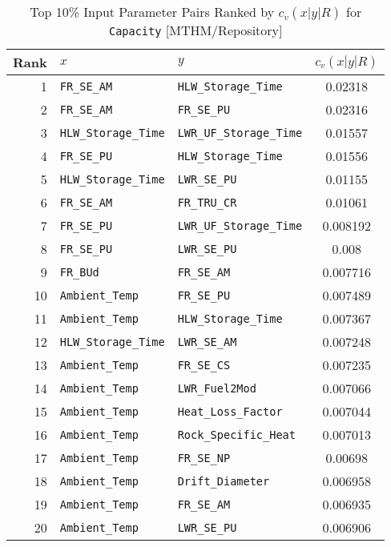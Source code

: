 \begin{center}
\begin{table}[htbp]
\caption{Top 10\% Input Parameter Pairs Ranked by $c_v(x|y|R)$ for \texttt{Capacity} [MTHM/Repository]}
\label{cv_x_y_R_for_Capacity_with_IJK7}
\begin{center}
\begin{tabular}{|r|l|l|c|}
\hline
Rank&\textbf{$x$}&\textbf{$y$}&\textbf{$c_v(x|y|R)$}\\
\hline
1&\texttt{FR\_SE\_AM}&\texttt{HLW\_Storage\_Time}&0.02318\\
\hline
2&\texttt{FR\_SE\_AM}&\texttt{FR\_SE\_PU}&0.02316\\
\hline
3&\texttt{HLW\_Storage\_Time}&\texttt{LWR\_UF\_Storage\_Time}&0.01557\\
\hline
4&\texttt{FR\_SE\_PU}&\texttt{HLW\_Storage\_Time}&0.01556\\
\hline
5&\texttt{HLW\_Storage\_Time}&\texttt{LWR\_SE\_PU}&0.01155\\
\hline
6&\texttt{FR\_SE\_AM}&\texttt{FR\_TRU\_CR}&0.01061\\
\hline
7&\texttt{FR\_SE\_PU}&\texttt{LWR\_UF\_Storage\_Time}&0.008192\\
\hline
8&\texttt{FR\_SE\_PU}&\texttt{LWR\_SE\_PU}&0.008\\
\hline
9&\texttt{FR\_BUd}&\texttt{FR\_SE\_AM}&0.007716\\
\hline
10&\texttt{Ambient\_Temp}&\texttt{FR\_SE\_PU}&0.007489\\
\hline
11&\texttt{Ambient\_Temp}&\texttt{HLW\_Storage\_Time}&0.007367\\
\hline
12&\texttt{HLW\_Storage\_Time}&\texttt{LWR\_SE\_AM}&0.007248\\
\hline
13&\texttt{Ambient\_Temp}&\texttt{FR\_SE\_CS}&0.007235\\
\hline
14&\texttt{Ambient\_Temp}&\texttt{LWR\_Fuel2Mod}&0.007066\\
\hline
15&\texttt{Ambient\_Temp}&\texttt{Heat\_Loss\_Factor}&0.007044\\
\hline
16&\texttt{Ambient\_Temp}&\texttt{Rock\_Specific\_Heat}&0.007013\\
\hline
17&\texttt{Ambient\_Temp}&\texttt{FR\_SE\_NP}&0.00698\\
\hline
18&\texttt{Ambient\_Temp}&\texttt{Drift\_Diameter}&0.006958\\
\hline
19&\texttt{Ambient\_Temp}&\texttt{FR\_SE\_AM}&0.006935\\
\hline
20&\texttt{Ambient\_Temp}&\texttt{LWR\_SE\_PU}&0.006906\\

\end{tabular}
\end{center}
\end{table}
\end{center}
